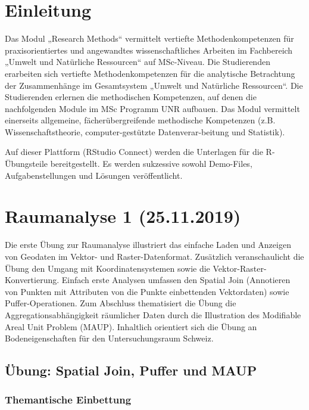 \documentclass[]{book}
\begin{document}
{
\setcounter{tocdepth}{1}
\tableofcontents
}
\hypertarget{einleitung}{%
\chapter{Einleitung}\label{einleitung}}

Das Modul „Research Methods`` vermittelt vertiefte Methodenkompetenzen für praxisorientiertes und angewandtes wissenschaftliches Arbeiten im Fachbereich „Umwelt und Natürliche Ressourcen`` auf MSc-Niveau. Die Studierenden erarbeiten sich vertiefte Methodenkompetenzen für die analytische Betrachtung der Zusammenhänge im Gesamtsystem „Umwelt und Natürliche Ressourcen``. Die Studierenden erlernen die methodischen Kompetenzen, auf denen die nachfolgenden Module im MSc Programm UNR aufbauen. Das Modul vermittelt einerseits allgemeine, fächerübergreifende methodische Kompetenzen (z.B. Wissenschaftstheorie, computer-gestützte Datenverar-beitung und Statistik).

Auf dieser Plattform (RStudio Connect) werden die Unterlagen für die R-Übungsteile bereitgestellt. Es werden sukzessive sowohl Demo-Files, Aufgabenstellungen und Lösungen veröffentlicht.

\hypertarget{raumanalyse-1-25.11.2019}{%
\chapter{Raumanalyse 1 (25.11.2019)}\label{raumanalyse-1-25.11.2019}}

Die erste Übung zur Raumanalyse illustriert das einfache Laden und Anzeigen von Geodaten im Vektor- und Raster-Datenformat. Zusätzlich veranschaulicht die Übung den Umgang mit Koordinatensystemen sowie die Vektor-Raster-Konvertierung. Einfach erste Analysen umfassen den Spatial Join (Annotieren von Punkten mit Attributen von die Punkte einbettenden Vektordaten) sowie Puffer-Operationen. Zum Abschluss thematisiert die Übung die Aggregationsabhängigkeit räumlicher Daten durch die Illustration des Modifiable Areal Unit Problem (MAUP). Inhaltlich orientiert sich die Übung an Bodeneigenschaften für den Untersuchungsraum Schweiz.

\hypertarget{ubung-spatial-join-puffer-und-maup}{%
\section{Übung: Spatial Join, Puffer und MAUP}\label{ubung-spatial-join-puffer-und-maup}}

\hypertarget{themantische-einbettung}{%
\subsection{Themantische Einbettung}\label{themantische-einbettung}}
\end{document}
